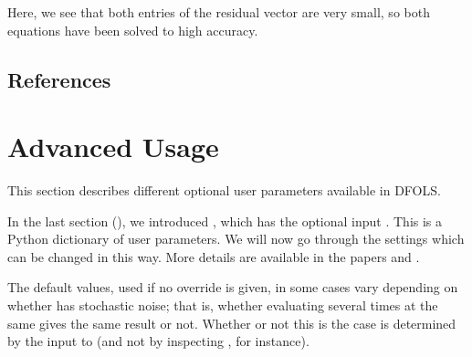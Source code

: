 \documentclass[letterpaper,10pt,english]{sphinxmanual}
\begin{document}
\sphinxAtStartPar
Here, we see that both entries of the residual vector are very small, so both equations have been solved to high accuracy.


\section{References}
\label{\detokenize{userguide:references}}
\sphinxstepscope


\chapter{Advanced Usage}
\label{\detokenize{advanced:advanced-usage}}\label{\detokenize{advanced::doc}}
\sphinxAtStartPar
This section describes different optional user parameters available in DFO\sphinxhyphen{}LS.

\sphinxAtStartPar
In the last section ({\hyperref[\detokenize{userguide::doc}]{}}), we introduced , which has the optional input . This is a Python dictionary of user parameters. We will now go through the settings which can be changed in this way. More details are available in the papers  and .

\sphinxAtStartPar
The default values, used if no override is given, in some cases vary depending on whether  has stochastic noise; that is, whether evaluating  several times at the same  gives the same result or not. Whether or not this is the case is determined by the  input to  (and not by inspecting , for instance).
\end{document}
